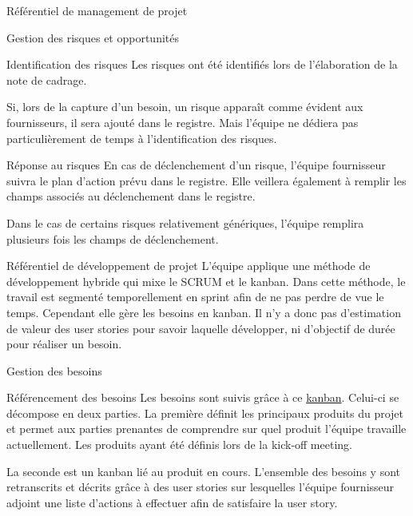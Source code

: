 \documentclass[]{article}
\begin{document}
{\begin{section}{\label{sec:Référentiel de management de projet}Référentiel de management de projet}
\begin{subsection}{\label{sec:Gestion des risques et opportunités}Gestion des risques et opportunités}
         \begin{subsubsection}{\label{sec:Identification des risques}Identification des risques}
             Les risques ont été identifiés lors de l'élaboration de la note de cadrage.

             Si, lors de la capture d'un besoin, un risque apparaît comme évident aux fournisseurs, il sera ajouté dans le registre. Mais l'équipe ne dédiera pas particulièrement de temps à l'identification des risques.
         \end{subsubsection}

         \begin{subsubsection}{\label{sec:Réponse au risques}Réponse au risques}
             En cas de déclenchement d'un risque, l'équipe fournisseur suivra le plan d'action prévu dans le registre. Elle veillera également à remplir les champs associés au déclenchement dans le registre.

             Dans le cas de certains risques relativement génériques, l'équipe remplira plusieurs fois les champs de déclenchement.
         \end{subsubsection}
     \end{subsection}
    \end{section}

\newpage

    \begin{section}{\label{sec:Référentiel de développement de projet}Référentiel de développement de projet}
     L’équipe applique une méthode de développement hybride qui mixe le SCRUM et le kanban. Dans cette méthode, le travail est segmenté temporellement en sprint afin de ne pas perdre de vue le temps. Cependant elle gère les besoins en kanban. Il n’y a donc pas d’estimation de valeur des user stories pour savoir laquelle développer, ni d’objectif de durée pour réaliser un besoin.
     \begin{subsection}{\label{sec:Gestion des besoins}Gestion des besoins}
         \begin{subsubsection}{\label{sec:Référencement des besoins}Référencement des besoins}
             Les besoins sont suivis grâce à ce \href{https://wekan.flopedt.org/b/HsRkBw5rbmQt5PQet/catalogue}{kanban}. Celui-ci se décompose en deux parties. La première définit les principaux produits du projet et permet aux parties prenantes de comprendre sur quel produit l'équipe travaille actuellement. Les produits ayant été définis lors de la kick-off meeting.

             La seconde est un kanban lié au produit en cours. L'ensemble des besoins y sont retranscrits et décrits grâce à des user stories sur lesquelles l'équipe fournisseur adjoint une liste d'actions à effectuer afin de satisfaire la user story.


\end{subsubsection}
\end{subsection}
\end{section}}
\end{document}
